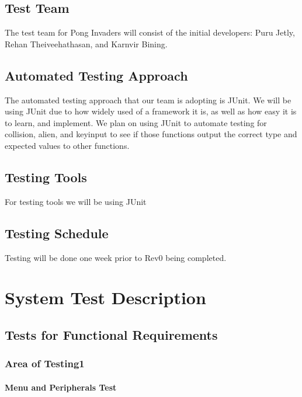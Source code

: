 \documentclass[12pt, titlepage]{article}
\begin{document}
\subsection{Test Team}
The test team for Pong Invaders will consist of the initial developers: Puru
Jetly, Rehan Theiveehathasan, and Karnvir Bining.


\subsection{Automated Testing Approach}
The automated testing approach that our team is adopting is JUnit. We will be
using JUnit due to how widely used of a framework it is, as well as how easy it
is to learn, and implement. We plan on using JUnit to automate testing for
collision, alien, and keyinput to see if those functions output the correct
type and expected values to other functions.


\subsection{Testing Tools}
For testing tools we will be using JUnit

\subsection{Testing Schedule}
Testing will be done one week prior to Rev0 being completed.

\section{System Test Description}
	
\subsection{Tests for Functional Requirements}

\subsubsection{Area of Testing1}
		
\paragraph{Menu and Peripherals Test}
\end{document}
